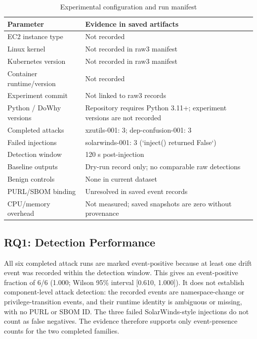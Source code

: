 \documentclass[conference]{IEEEtran}
\begin{document}
\begin{table}[!t]\caption{Experimental configuration and run manifest}\label{tab:manifest}\centering\scriptsize
\begin{tabularx}{\columnwidth}{>{\raggedright\arraybackslash}p{}X}\toprule
Parameter & Evidence in saved artifacts\\\midrule
EC2 instance type & Not recorded\\
Linux kernel & Not recorded in raw3 manifest\\
Kubernetes version & Not recorded in raw3 manifest\\
Container runtime/version & Not recorded\\
Experiment commit & Not linked to raw3 records\\
Python / DoWhy versions & Repository requires Python 3.11+; experiment versions are not recorded\\
Completed attacks & xzutils-001: 3; dep-confusion-001: 3\\
Failed injections & solarwinds-001: 3 (`inject() returned False`)\\
Detection window & 120 s post-injection\\
Baseline outputs & Dry-run record only; no comparable raw detections\\
Benign controls & None in current dataset\\
PURL/SBOM binding & Unresolved in saved event records\\
CPU/memory overhead & Not measured; saved snapshots are zero without provenance\\\bottomrule
\end{tabularx}\end{table}

\subsection{RQ1: Detection Performance}
All six completed attack runs are marked event-positive because at least one drift event was recorded within the detection window. This gives an event-positive fraction of 6/6 (1.000; Wilson 95\% interval [0.610, 1.000]). It does not establish component-level attack detection: the recorded events are namespace-change or privilege-transition events, and their runtime identity is ambiguous or missing, with no PURL or SBOM ID. The three failed SolarWinds-style injections do not count as false negatives. The evidence therefore supports only event-presence counts for the two completed families.
\end{document}
